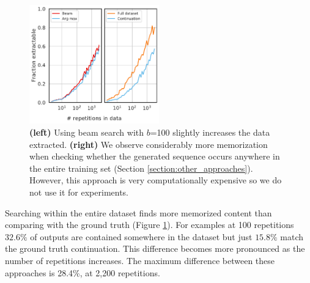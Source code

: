 
\begin{figure}[h]
    \centering
    \includegraphics[width=0.5\textwidth]{figures/beam_search_and_overall} %
    \caption{
    \textbf{(left)} Using beam search with $b$=100 slightly increases the data extracted. 
    \textbf{(right)} We observe considerably more memorization when checking whether the generated sequence occurs anywhere in the entire training set (Section \ref{section:other_approaches}). However, this approach is very computationally expensive so we do not use it for experiments.
    }
    \label{fig:other_approaches_search}
\end{figure}

Searching within the entire dataset finds more memorized content than comparing with the ground truth (Figure \ref{fig:other_approaches_search}). 
For examples at 100 repetitions $32.6\%$ of outputs are contained somewhere in the dataset but just $15.8\%$ match the ground truth continuation.
This difference becomes more pronounced as the number of repetitions increases. 
The maximum difference between these approaches is 28.4\%, at 2{,}200 repetitions.

